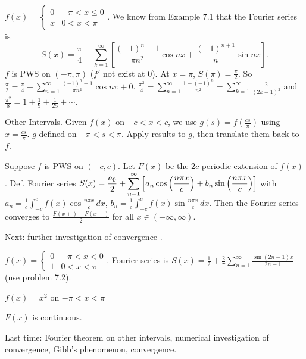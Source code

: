 \documentclass[]{article}
\begin{document}
\begin{example}
	$f(x) = \begin{cases} 0 & -\pi<x\leq 0 \\ x & 0<x<\pi \end{cases}$. We know from Example 7.1 that the Fourier series is $$S(x) = \frac{\pi}{4} + \sum_{k=1}^\infty \left[ \frac{(-1)^n-1}{\pi n^2}\cos{nx} + \frac{(-1)^{n+1}}{n}\sin{nx}\right].$$ $f$ is PWS on $(-\pi,\pi)$ ($f'$ not exist at 0). At $x=\pi$, $S(\pi) = \frac{\pi}{2}$. So $\frac{\pi}{2} = \frac{\pi}{4} + \sum_{n=1}^\infty \frac{(-1)^n-1}{\pi n^2} \cos{n\pi} + 0$. $\frac{\pi^2}{4} = \sum_{n=1}^\infty \frac{1-(-1)^n}{n^2} = \sum_{k=1}^\infty \frac{2}{(2k-1)^2}$ and $\frac{\pi^2}{8} = 1 + \frac{1}{9} + \frac{1}{25} + \cdots$.
\end{example}

Other Intervals.
Given $f(x)$ on $-c<x<c$, we use $g(s) = f\left(\frac{cs}{\pi}\right)$ using $x=\frac{cs}{\pi}$. $g$ defined on $-\pi<s<\pi$. Apply results to $g$, then translate them back to $f$.
\begin{theorem}
	Suppose $f$ is PWS on $(-c,c)$. Let $F(x)$ be the $2c$-periodic extension of $f(x)$. Def. Fourier series
	$\displaystyle S(x) = \frac{a_0}{2} + \sum_{n=1}^\infty \left[ a_n \cos{\left(\frac{n\pi x}{c}\right)} + b_n \sin{\left(\frac{n\pi x}{c} \right)} \right]$
	with $a_n = \frac{1}{c} \int_{-c}^c f(x) \cos{\frac{n\pi x}{c}} \, dx$, $b_n = \frac{1}{c} \int_{-c}^c f(x) \sin{\frac{n\pi x}{c}} \, dx$. Then the Fourier series converges to $\frac{F(x+)-F(x-)}{2}$ for all $x\in (-\infty,\infty)$.
\end{theorem}

Next: further investigation of convergence .
\begin{example}
	$f(x) = \begin{cases} 0 & -\pi<x<0 \\ 1 & 0<x<\pi \end{cases}$. Fourier series is $S(x) = \frac{1}{2} + \frac{2}{\pi} \sum_{n=1}^\infty \frac{\sin{(2n-1)x}}{2n-1}$ (use problem 7.2).
\end{example}
\begin{example}
	$f(x) = x^2 $ on $-\pi<x<\pi$
	\begin{note}
		$F(x)$ is continuous.
	\end{note}
\end{example}

Last time: Fourier theorem on other intervals, numerical investigation of convergence, Gibb's phenomenon,  convergence.
\end{document}
